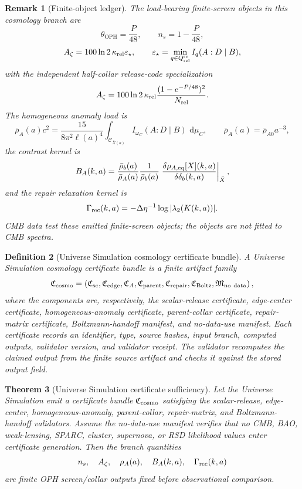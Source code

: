 \documentclass[11pt]{article}
\newtheorem{theorem}{Theorem}[section]
\newtheorem{definition}[theorem]{Definition}
\newtheorem{remark}[theorem]{Remark}
\newcommand{\OPH}{\mathrm{OPH}}
\newcommand{\dd}{\,\mathrm d}
\begin{document}
\begin{remark}[Finite-object ledger]\label{rem:finite-object-ledger}
The load-bearing finite-screen objects in this cosmology branch are
\[
\theta_{\OPH}=\frac{P}{48},
\qquad
n_s=1-\frac{P}{48},
\]
\[
A_\zeta
=
100\ln2\,\kappa_{\rm rel}\varepsilon_\star,
\qquad
\varepsilon_\star
=
\min_{q\in Q_{\rm rel}^{\rm sc}} I_q(A:D\mid B),
\]
with the independent half-collar release-code specialization
\[
A_\zeta
=
100\ln2\,\kappa_{\rm rel}
\frac{(1-e^{-P/48})^2}{N_{\rm rel}}.
\]
The homogeneous anomaly load is
\[
\bar\rho_A(a)c^2
=
\frac{15}{8\pi^2\ell(a)^4}
\int_{\mathcal C_{\bar X(a)}}
I_{\omega_C}(A:D\mid B)\,\dd\mu_C,
\qquad
\bar\rho_A(a)=\bar\rho_{A0}a^{-3},
\]
the contrast kernel is
\[
B_A(k,a)
=
\frac{\bar\rho_b(a)}{\bar\rho_A(a)}
\frac{1}{\bar\rho_b(a)}
\left.
\frac{\delta\rho_{A,\rm eq}[X](k,a)}
{\delta\delta_b(k,a)}
\right|_{\bar X},
\]
and the repair relaxation kernel is
\[
\Gamma_{\rm rec}(k,a)
=
-\Delta\eta^{-1}\log|\lambda_2(K(k,a))|.
\]
CMB data test these emitted finite-screen objects; the objects are not fitted to CMB spectra.
\end{remark}

\begin{definition}[Universe Simulation cosmology certificate bundle]\label{def:unisim-cert-bundle}
A Universe Simulation cosmology certificate bundle is a finite artifact family
\[
\mathfrak C_{\rm cosmo}
=
\left(
\mathfrak C_{\rm sc},
\mathfrak C_{\rm edge},
\mathfrak C_A,
\mathfrak C_{\rm parent},
\mathfrak C_{\rm repair},
\mathfrak C_{\rm Boltz},
\mathfrak M_{\rm no\ data}
\right),
\]
where the components are, respectively, the scalar-release certificate, edge-center certificate,
homogeneous-anomaly certificate, parent-collar certificate, repair-matrix certificate,
Boltzmann-handoff manifest, and no-data-use manifest. Each certificate records an identifier, type,
source hashes, input branch, computed outputs, validator version, and validator receipt. The
validator recomputes the claimed output from the finite source artifact and checks it against the
stored output field.
\end{definition}

\begin{theorem}[Universe Simulation certificate sufficiency]\label{thm:unisim-cert-sufficiency}
Let the Universe Simulation emit a certificate bundle \(\mathfrak C_{\rm cosmo}\) satisfying the
scalar-release, edge-center, homogeneous-anomaly, parent-collar, repair-matrix, and
Boltzmann-handoff validators. Assume the no-data-use manifest verifies that no CMB, BAO,
weak-lensing, SPARC, cluster, supernova, or RSD likelihood values enter certificate generation.
Then the branch quantities
\[
n_s,\quad
A_\zeta,\quad
\rho_A(a),\quad
B_A(k,a),\quad
\Gamma_{\rm rec}(k,a)
\]
are finite OPH screen/collar outputs fixed before observational comparison.
\end{theorem}
\end{document}
